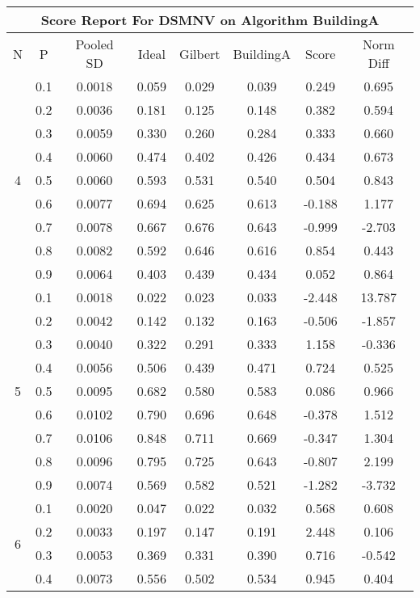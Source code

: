 \documentclass[11pt,a4paper]{report}
\begin{document}
\begin{longtable}{ | c | c || c | c | c | c | c | c | }
\hline
\multicolumn{8}{|c|}{ Score Report For DSMNV on Algorithm BuildingA} \\
\hline
N & P & Pooled SD &  Ideal &  Gilbert & BuildingA  & Score & Norm Diff \\
 \hline
 \hline
 \endhead
\multirow{9}{*}{4} & 0.1 & 0.0018 & 0.059 & 0.029 & 0.039 & 0.249 & 0.695 \\
 & 0.2 & 0.0036 & 0.181 & 0.125 & 0.148 & 0.382 & 0.594 \\
 & 0.3 & 0.0059 & 0.330 & 0.260 & 0.284 & 0.333 & 0.660 \\
 & 0.4 & 0.0060 & 0.474 & 0.402 & 0.426 & 0.434 & 0.673 \\
 & 0.5 & 0.0060 & 0.593 & 0.531 & 0.540 & 0.504 & 0.843 \\
 & 0.6 & 0.0077 & 0.694 & 0.625 & 0.613 & -0.188 & 1.177 \\
 & 0.7 & 0.0078 & 0.667 & 0.676 & 0.643 & -0.999 & -2.703 \\
 & 0.8 & 0.0082 & 0.592 & 0.646 & 0.616 & 0.854 & 0.443 \\
 & 0.9 & 0.0064 & 0.403 & 0.439 & 0.434 & 0.052 & 0.864 \\
 \hline
\multirow{9}{*}{5} & 0.1 & 0.0018 & 0.022 & 0.023 & 0.033 & -2.448 & 13.787 \\
 & 0.2 & 0.0042 & 0.142 & 0.132 & 0.163 & -0.506 & -1.857 \\
 & 0.3 & 0.0040 & 0.322 & 0.291 & 0.333 & 1.158 & -0.336 \\
 & 0.4 & 0.0056 & 0.506 & 0.439 & 0.471 & 0.724 & 0.525 \\
 & 0.5 & 0.0095 & 0.682 & 0.580 & 0.583 & 0.086 & 0.966 \\
 & 0.6 & 0.0102 & 0.790 & 0.696 & 0.648 & -0.378 & 1.512 \\
 & 0.7 & 0.0106 & 0.848 & 0.711 & 0.669 & -0.347 & 1.304 \\
 & 0.8 & 0.0096 & 0.795 & 0.725 & 0.643 & -0.807 & 2.199 \\
 & 0.9 & 0.0074 & 0.569 & 0.582 & 0.521 & -1.282 & -3.732 \\
 \hline
\multirow{9}{*}{6} & 0.1 & 0.0020 & 0.047 & 0.022 & 0.032 & 0.568 & 0.608 \\
 & 0.2 & 0.0033 & 0.197 & 0.147 & 0.191 & 2.448 & 0.106 \\
 & 0.3 & 0.0053 & 0.369 & 0.331 & 0.390 & 0.716 & -0.542 \\
 & 0.4 & 0.0073 & 0.556 & 0.502 & 0.534 & 0.945 & 0.404 \\

\end{longtable}
\end{document}
